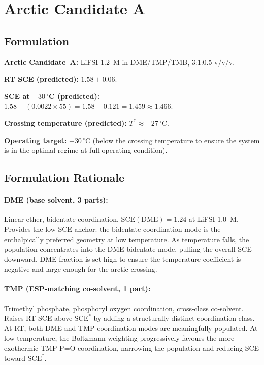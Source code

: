 \documentclass[11pt]{article}
\theoremstyle{plain}
\theoremstyle{definition}
\theoremstyle{remark}
\begin{document}
\section{Arctic Candidate A}
\label{sec:candidateA}

\subsection{Formulation}

\textbf{Arctic Candidate~A:} LiFSI 1.2~M in DME/TMP/TMB,
3:1:0.5 v/v/v.

\textbf{RT SCE (predicted):} $1.58 \pm 0.06$.

\textbf{SCE at $-30\,^\circ$C (predicted):}
$1.58 - (0.0022 \times 55) = 1.58 - 0.121 = 1.459 \approx 1.466$.

\textbf{Crossing temperature (predicted):} $T^{*} \approx -27\,^\circ$C.

\textbf{Operating target:} $-30\,^\circ$C (below the crossing
temperature to ensure the system is in the optimal regime at
full operating condition).

\subsection{Formulation Rationale}

\paragraph{DME (base solvent, 3 parts):}
Linear ether, bidentate coordination, $\mathrm{SCE}(\mathrm{DME})
= 1.24$ at LiFSI 1.0~M.  Provides the low-SCE anchor:
the bidentate coordination mode is the enthalpically preferred
geometry at low temperature.  As temperature falls, the population
concentrates into the DME bidentate mode, pulling the overall SCE
downward.  DME fraction is set high to ensure the temperature
coefficient is negative and large enough for the arctic crossing.

\paragraph{TMP (ESP-matching co-solvent, 1 part):}
Trimethyl phosphate, phosphoryl oxygen coordination,
cross-class co-solvent.  Raises RT SCE above $\mathrm{SCE}^{*}$
by adding a structurally distinct coordination class.  At RT,
both DME and TMP coordination modes are meaningfully populated.
At low temperature, the Boltzmann weighting progressively favours
the more exothermic TMP P=O coordination, narrowing the population
and reducing SCE toward $\mathrm{SCE}^{*}$.
\end{document}
